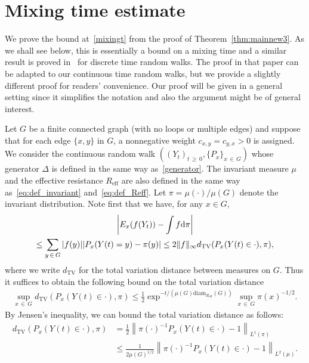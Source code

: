 \documentclass[10pt]{amsart}
\theoremstyle{definition}\newtheorem{defi}[theo]{Definition}\newtheorem{rema}[theo]{Remark}\newtheorem{exam}[theo]{Example}\newtheorem{exem}[theo]{Example}\newtheorem{nota}[theo]{Notation}
\newcommand{\dd}{\text{\upshape{d}}}
\begin{document}
\section{Mixing time estimate}\label{app:mixingt}

We prove the bound at~\eqref{mixingt} from the proof of Theorem~\ref{thm:mainnew3}. As we shall see below, this is essentially a bound on a mixing time and a similar result is proved in~\cite[Lemma~4.1, Corollary~4.2]{NP08} for discrete time random walks. The proof in that paper can be adapted to our continuous time random walks, but we provide a slightly different proof for readers' convenience. Our proof will be given in a general setting since it simplifies the notation and also the argument might be of general interest.

Let $G$ be a finite connected graph (with no loops or multiple edges) and suppose that for each edge $\{x,y\}$ in $G$, a nonnegative weight $c_{x,y}=c_{y,x}> 0$ is assigned. We consider the continuous random walk $((Y_t)_{t\,\ge\,0}, \{P_x\}_{x\,\in\,G})$ whose generator $\Delta$ is defined in the same way as~\eqref{generator}. The invariant measure $\mu$ and the effective resistance $R_{\text{eff}}$ are also defined in the same way as~\eqref{eq:def_invariant} and~\eqref{eq:def_Reff}. Let $\pi=\mu(\cdot)/\mu(G)$ denote the invariant distribution. Note first that we have, for any $x\in G$,
\begin{multline*}
\left|E_x(f(Y_t))-\int f \dd \pi\right| \\
\le \sum_{y\,\in\,G} |f(y)| |P_x(Y(t)=y)-\pi(y)|\le 2\|f\|_\infty d_{\text{TV}}(P_x(Y(t)\in\cdot),\pi),
\end{multline*}
where we write $d_{\text{TV}}$ for the total variation distance between measures on $G$. Thus it suffices to obtain the following bound on the total variation distance
\begin{align}\label{eq:TVgoal}
\sup_{x\,\in\,G}d_{\text{TV}}(P_x(Y(t)\in\cdot),\pi)
\le \frac{1}{2}\exp^{-t/\left(\mu(G)\text{diam}_{R_{\text{eff}}}(G)\right)}\sup_{x\,\in\,G}\pi(x)^{-1/2}.
\end{align}
By Jensen's inequality, we can bound the total variation distance as follows:
\begin{equation}\label{eq:L^1-L^2}
\begin{split}
d_{\text{TV}}(P_x(Y(t)\in\cdot),\pi) &=\frac{1}{2}\left\|\pi(\cdot)^{-1}P_x(Y(t)\in\cdot)-1\right\|_{L^1(\pi)}\\
&\le \frac{1}{2\mu(G)^{1/2}}\left\|\pi(\cdot)^{-1}P_x(Y(t)\in\cdot)-1\right\|_{L^2(\mu)}.
\end{split}
\end{equation}
\end{document}
